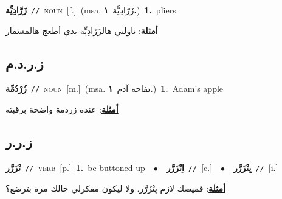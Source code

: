 \documentclass[10pt,a4paper,twoside]{article} %
\begin{document}
\begin{multicols}{2}
{\setlength\topsep{0pt}\textbf{\foreignlanguage{arabic}{زَرَّادِيِّة}}\ {\color{gray}\texttt{//}\color{black}}\ \textsc{noun}\ [f.]\ \color{gray}(msa. \foreignlanguage{arabic}{زَرّادِيَّة}~\foreignlanguage{arabic}{\textbf{١.}})\color{black}\ \textbf{1.}~pliers\  \begin{flushright}\color{gray}\foreignlanguage{arabic}{\textbf{\underline{\foreignlanguage{arabic}{أمثلة}}}: ناولني هالزَرّادِيِّة بدي أطعج هالمسمار}\end{flushright}\color{black}} \vspace{2mm}

\vspace{-3mm}
\subsection*{\color{blue}\foreignlanguage{arabic}{ز.ر.د.م}\color{blue}{}} 

{\setlength\topsep{0pt}\textbf{\foreignlanguage{arabic}{زُرْدُمِّة}}\ {\color{gray}\texttt{//}\color{black}}\ \textsc{noun}\ [m.]\ \color{gray}(msa. \foreignlanguage{arabic}{تفاحة آدم}~\foreignlanguage{arabic}{\textbf{١.}})\color{black}\ \textbf{1.}~Adam's apple\  \begin{flushright}\color{gray}\foreignlanguage{arabic}{\textbf{\underline{\foreignlanguage{arabic}{أمثلة}}}: عنده زردمة واضحة برقبته}\end{flushright}\color{black}} \vspace{2mm}

\vspace{-3mm}
\subsection*{\color{blue}\foreignlanguage{arabic}{ز.ر.ر}\color{blue}{}} 

{\setlength\topsep{0pt}\textbf{\foreignlanguage{arabic}{تْزَرَّر}}\ {\color{gray}\texttt{//}\color{black}}\ \textsc{verb}\ [p.]\ \textbf{1.}~be buttoned up\ \ $\bullet$\ \ \setlength\topsep{0pt}\textbf{\foreignlanguage{arabic}{اِتْزَرَّر}}\ {\color{gray}\texttt{//}\color{black}}\ [c.]\ \ $\bullet$\ \ \setlength\topsep{0pt}\textbf{\foreignlanguage{arabic}{يِتْزَرَّر}}\ {\color{gray}\texttt{//}\color{black}}\ [i.]\  \begin{flushright}\color{gray}\foreignlanguage{arabic}{\textbf{\underline{\foreignlanguage{arabic}{أمثلة}}}: قميصك لازم يِتْزَرَّر. ولا ليكون مفكرلي حالك مرة بترضع؟}\end{flushright}\color{black}} \vspace{2mm}


\end{multicols}
\end{document}
